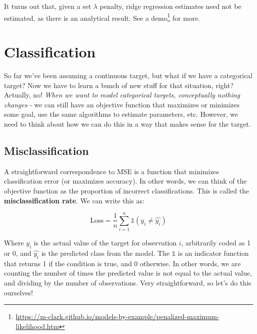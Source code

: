 \documentclass[
  letterpaper,
]{krantz}
\DeclareRobustCommand{\href}[2]{#2\footnote{\url{#1}}}
\begin{document}
\begin{tcolorbox}[enhanced jigsaw, opacityback=0, leftrule=.75mm, bottomrule=.15mm, colframe=quarto-callout-tip-color-frame, rightrule=.15mm, breakable, left=2mm, colback=white, arc=.35mm, toprule=.15mm]

It turns out that, given a set \(\lambda\) penalty, ridge regression
estimates need not be estimated, as there is an analytical result. See a
\href{https://m-clark.github.io/models-by-example/penalized-maximum-likelihood.htm}{demo}
for more.

\end{tcolorbox}

\section{Classification}\label{sec-estim-classification}

So far we've been assuming a continuous target, but what if we have a
categorical target? Now we have to learn a bunch of new stuff for that
situation, right? Actually, no! \emph{When we want to model categorical
targets, conceptually nothing changes} - we can still have an objective
function that maximizes or minimizes some goal, use the same algorithms
to estimate parameters, etc. However, we need to think about how we can
do this in a way that makes sense for the target.

\subsection{Misclassification}\label{sec-estim-misclass}

A straightforward correspondence to MSE is a function that minimizes
classification error (or maximizes accuracy). In other words, we can
think of the objective function as the proportion of incorrect
classifications. This is called the \textbf{misclassification rate}. We
can write this as:

\[
\textrm{Loss} = \frac{1}{n} \sum_{i=1}^{n} \mathbb{1}(y_i \neq \hat{y_i})
\]

Where \(y_i\) is the actual value of the target for observation \(i\),
arbitrarily coded as 1 or 0, and \(\hat{y_i}\) is the predicted class
from the model. The \(\mathbb{1}\) is an indicator function that returns
1 if the condition is true, and 0 otherwise. In other words, we are
counting the number of times the predicted value is not equal to the
actual value, and dividing by the number of observations. Very
straightforward, so let's do this ourselves!
\end{document}
